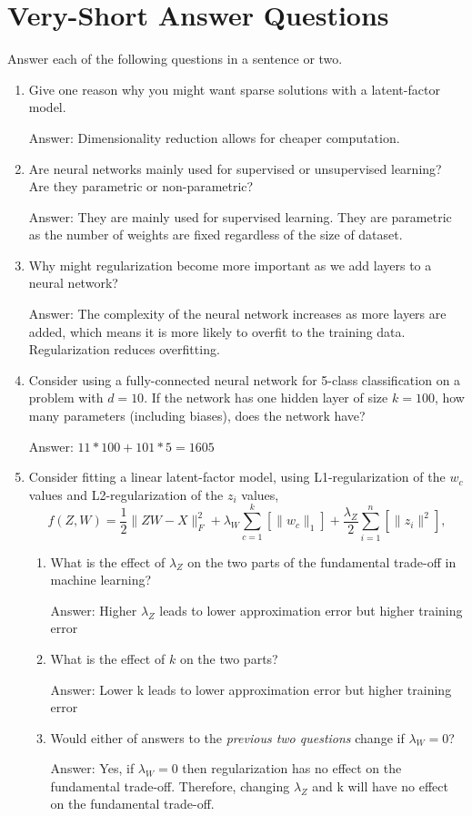 \documentclass{article}
\newcommand{\blu}[1]{{\textcolor{blu}{#1}}}
\newcommand{\gre}[1]{\textcolor{gre}{#1}}
\newcommand\ans[1]{\par\gre{Answer: #1}}
\let\ask\blu
\newcommand{\norm}[1]{\lVert #1 \rVert}
\begin{document}
\section{Very-Short Answer Questions}

\ask{Answer each of the following questions in a sentence or two.}
\begin{enumerate}

\item Give one reason why you might want sparse solutions with a latent-factor model.
\ans{Dimensionality reduction allows for cheaper computation.}
\item{Are neural networks mainly used for supervised or unsupervised learning? Are they parametric or non-parametric?}
\ans{They are mainly used for supervised learning. They are parametric as the number of weights are fixed regardless of the size of dataset.}
\item{Why might regularization become more important as we add layers to a neural network?}
\ans{The complexity of the neural network increases as more layers are added, which means it is more likely to overfit to the training data. Regularization reduces overfitting.}
\item{Consider using a fully-connected neural network for 5-class classification on a problem with $d=10$. If the network has one hidden layer of size $k=100$, how many parameters (including biases), does the network have?}
\ans{$11*100+101*5=1605$}
\item Consider fitting a linear latent-factor model, using L1-regularization of the $w_c$ values and L2-regularization of the $z_i$ values,
\[
f(Z,W) = \frac{1}{2}\norm{ZW - X}_F^2 + \lambda_W \sum_{c=1}^k \left[\norm{w_c}_1\right] + \frac{\lambda_Z}{2} \sum_{i=1}^n \left[\norm{z_i}^2\right],
\]
\begin{enumerate}
\item What is the effect of $\lambda_Z$ on the two parts of the fundamental trade-off in machine learning? 
\ans{Higher $\lambda_Z$ leads to lower approximation error but higher training error}
\item What is the effect of $k$ on the two parts?
\ans{Lower k leads to lower approximation error but higher training error}
\item Would either of answers to the \emph{previous two questions} change if $\lambda_W = 0$?
\ans{Yes, if $\lambda_W = 0$ then regularization has no effect on the fundamental trade-off. Therefore, changing $\lambda_Z$  and k will have no effect on the fundamental trade-off.}

\end{enumerate}
\end{enumerate}
\end{document}

